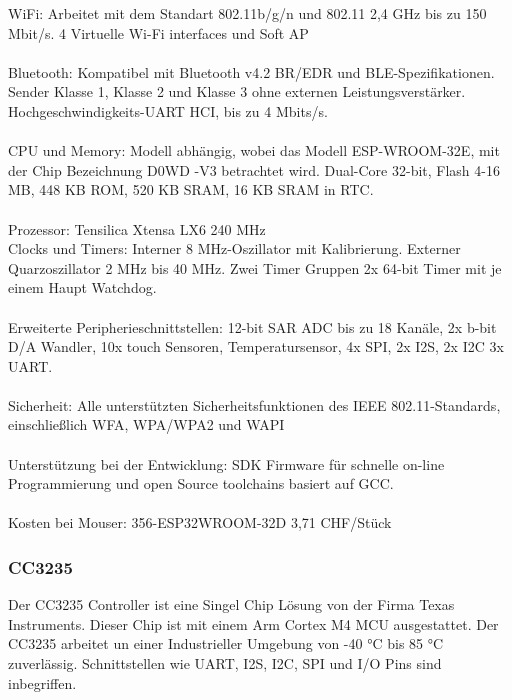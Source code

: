 WiFi:
Arbeitet mit dem Standart 802.11b/g/n und 802.11 2,4 GHz bis zu 150 Mbit/s. 4 Virtuelle Wi-Fi interfaces und Soft AP \\
\\
Bluetooth:
Kompatibel mit Bluetooth v4.2 BR/EDR und BLE-Spezifikationen. Sender Klasse 1, Klasse 2 und Klasse 3 ohne externen Leistungsverstärker. Hochgeschwindigkeits-UART HCI, bis zu 4 Mbits/s.\\
\\
CPU und Memory:
Modell abhängig, wobei das Modell ESP-WROOM-32E, mit der Chip Bezeichnung D0WD -V3 betrachtet wird. Dual-Core 32-bit, Flash 4-16 MB, 448 KB ROM, 520 KB SRAM, 16 KB SRAM in RTC. \\
\\
Prozessor:
Tensilica Xtensa LX6 240 MHz
\\
Clocks und Timers:
Interner 8 MHz-Oszillator mit Kalibrierung. Externer Quarzoszillator 2 MHz bis 40 MHz. Zwei Timer Gruppen 2x 64-bit Timer mit je einem Haupt Watchdog.\\
\\
Erweiterte Peripherieschnittstellen:
12-bit SAR ADC bis zu 18 Kanäle, 2x b-bit D/A Wandler, 10x touch Sensoren, Temperatursensor, 4x SPI, 2x I2S, 2x I2C 3x UART.\\
\\
Sicherheit:
Alle unterstützten Sicherheitsfunktionen des IEEE 802.11-Standards, einschließlich WFA, WPA/WPA2 und WAPI\\
\\
Unterstützung bei der Entwicklung:
SDK Firmware für schnelle on-line Programmierung und open Source toolchains basiert auf GCC.\\
\\
Kosten bei Mouser:
356-ESP32WROOM-32D 3,71 CHF/Stück
\newpage
\subsubsection{CC3235}
 Der CC3235 Controller ist eine Singel Chip Lösung von der Firma Texas Instruments. Dieser Chip ist mit einem Arm Cortex M4 MCU ausgestattet. Der CC3235 arbeitet un einer Industrieller Umgebung von -40 °C bis 85 °C zuverlässig. Schnittstellen wie UART, I2S, I2C, SPI und I/O Pins sind inbegriffen.

